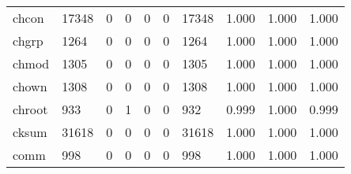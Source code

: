 \begin{longtable}{lp{1.3cm}p{1.3cm}p{1.3cm}p{1.3cm}p{1.3cm}p{1.3cm}p{1.3cm}p{1.3cm}p{1.3cm}}
chcon     &                  17348 &                                  0 &                                 0 &                                0 &                                 0 &                           17348 &                                   1.000 &                                  1.000 &                                1.000 \\
chgrp     &                   1264 &                                  0 &                                 0 &                                0 &                                 0 &                            1264 &                                   1.000 &                                  1.000 &                                1.000 \\
chmod     &                   1305 &                                  0 &                                 0 &                                0 &                                 0 &                            1305 &                                   1.000 &                                  1.000 &                                1.000 \\
chown     &                   1308 &                                  0 &                                 0 &                                0 &                                 0 &                            1308 &                                   1.000 &                                  1.000 &                                1.000 \\
chroot    &                    933 &                                  0 &                                 1 &                                0 &                                 0 &                             932 &                                   0.999 &                                  1.000 &                                0.999 \\
cksum     &                  31618 &                                  0 &                                 0 &                                0 &                                 0 &                           31618 &                                   1.000 &                                  1.000 &                                1.000 \\
comm      &                    998 &                                  0 &                                 0 &                                0 &                                 0 &                             998 &                                   1.000 &                                  1.000 &                                1.000 \\

\end{longtable}

